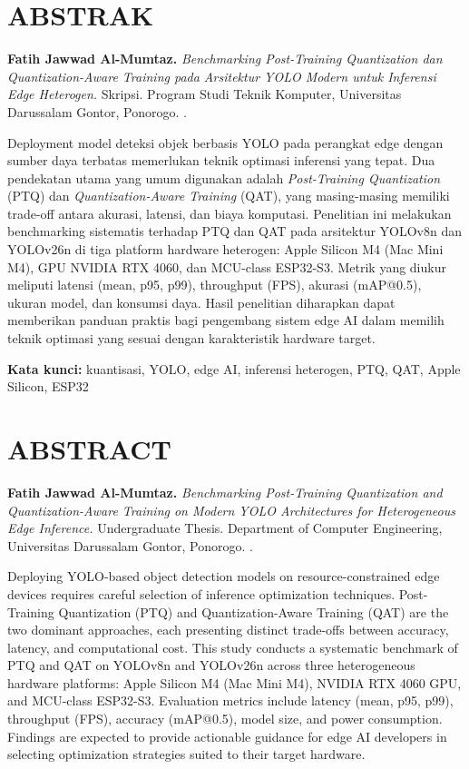 \documentclass[12pt, a4paper]{report}
\begin{document}
\chapter*{ABSTRAK}
\noindent\textbf{Fatih Jawwad Al-Mumtaz.}
\textit{Benchmarking Post-Training Quantization dan Quantization-Aware
Training pada Arsitektur YOLO Modern untuk Inferensi Edge Heterogen.}
Skripsi. Program Studi Teknik Komputer, Universitas Darussalam Gontor,
Ponorogo. \the\year.

\vspace{0.5cm}
Deployment model deteksi objek berbasis YOLO pada perangkat edge
dengan sumber daya terbatas memerlukan teknik optimasi inferensi yang
tepat. Dua pendekatan utama yang umum digunakan adalah
\textit{Post-Training Quantization} (PTQ) dan
\textit{Quantization-Aware Training} (QAT), yang masing-masing memiliki
trade-off antara akurasi, latensi, dan biaya komputasi.
Penelitian ini melakukan benchmarking sistematis terhadap PTQ dan QAT
pada arsitektur YOLOv8n dan YOLOv26n di tiga platform hardware heterogen:
Apple Silicon M4 (Mac Mini M4), GPU NVIDIA RTX 4060, dan MCU-class
ESP32-S3. Metrik yang diukur meliputi latensi (mean, p95, p99),
throughput (FPS), akurasi (mAP@0.5), ukuran model, dan konsumsi daya.
Hasil penelitian diharapkan dapat memberikan panduan praktis bagi
pengembang sistem edge AI dalam memilih teknik optimasi yang sesuai
dengan karakteristik hardware target.

\vspace{0.5cm}
\noindent\textbf{Kata kunci:} kuantisasi, YOLO, edge AI, inferensi heterogen, PTQ, QAT, Apple Silicon, ESP32
\newpage

\chapter*{ABSTRACT}
\noindent\textbf{Fatih Jawwad Al-Mumtaz.}
\textit{Benchmarking Post-Training Quantization and Quantization-Aware
Training on Modern YOLO Architectures for Heterogeneous Edge Inference.}
Undergraduate Thesis. Department of Computer Engineering,
Universitas Darussalam Gontor, Ponorogo. \the\year.

\vspace{0.5cm}
Deploying YOLO-based object detection models on resource-constrained
edge devices requires careful selection of inference optimization
techniques. Post-Training Quantization (PTQ) and Quantization-Aware
Training (QAT) are the two dominant approaches, each presenting
distinct trade-offs between accuracy, latency, and computational cost.
This study conducts a systematic benchmark of PTQ and QAT on YOLOv8n
and YOLOv26n across three heterogeneous hardware platforms: Apple
Silicon M4 (Mac Mini M4), NVIDIA RTX 4060 GPU, and MCU-class ESP32-S3.
Evaluation metrics include latency (mean, p95, p99), throughput (FPS),
accuracy (mAP@0.5), model size, and power consumption. Findings are
expected to provide actionable guidance for edge AI developers in
selecting optimization strategies suited to their target hardware.
\end{document}

